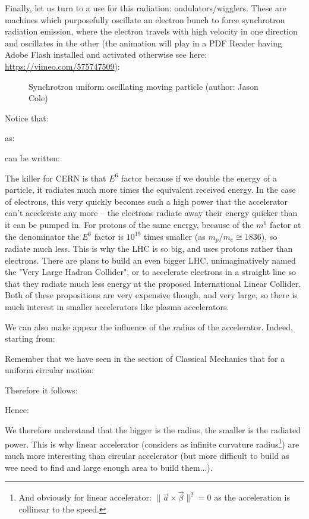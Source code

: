 	Finally, let us turn to a use for this radiation: ondulators/wigglers. These are machines which purposefully oscillate an electron bunch to force synchrotron radiation emission, where the electron travels with high velocity in one direction and oscillates in the other (the animation will play in a PDF Reader having Adobe Flash installed and activated otherwise see here: \url{https://vimeo.com/575747509}):
\begin{figure}[H]
		\caption[]{Synchrotron uniform oscillating moving particle (author: Jason Cole)}
	\end{figure}
	Notice that:
	
	as:
	
	can be written:
	
	The killer for CERN is that $E^6$ factor because if we double the energy of a particle, it radiates much more times the equivalent received energy. In the case of electrons, this very quickly becomes such a high power that the accelerator can't accelerate any more – the electrons radiate away their energy quicker than it can be pumped in. For protons of the same energy, because of the $m^6$ factor at the denominator the $E^6$ factor is $10^{19}$ times smaller (as $m_p/m_e\cong 1836$), so radiate much less. This is why the LHC is so big, and uses protons rather than electrons. There are plans to build an even bigger LHC, unimaginatively named the "Very Large Hadron Collider", or to accelerate electrons in a straight line so that they radiate much less energy at the proposed International Linear Collider. Both of these propositions are very expensive though, and very large, so there is much interest in smaller accelerators like plasma accelerators.
	
	We can also make appear the influence of the radius of the accelerator. Indeed, starting from:
	
	Remember that we have seen in the section of Classical Mechanics that for a uniform circular motion:
	
	Therefore it follows:
	
	Hence:
	
	We therefore understand that the bigger is the radius, the smaller is the radiated power. This is why linear accelerator (considers as infinite curvature radius\footnote{And obviously for linear accelerator: $\|\vec{a}\times\vec{\beta}\|^2=0$ as the acceleration is collinear to the speed.}) are much more interesting than circular accelerator (but more difficult to build as wee need to find and large enough area to build them...).
	
